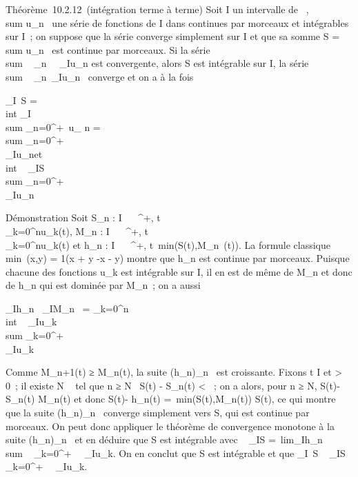 \documentclass[]{article}
\begin{document}
Théorème~10.2.12~(intégration terme à terme) Soit I un intervalle de ~,
\\sum  u\_n~ une
série de fonctions de I dans  continues par morceaux et intégrables sur
I~; on suppose que la série converge simplement sur I et que sa somme S
= \\sum  u\_n~
est continue par morceaux. Si la série
\\sum ~
\_n\in{}~\int ~
\_I\textbar{}u\_n\textbar{} est convergente, alors S est
intégrable sur I, la série
\\sum ~
\_n\in{}~\int  \_Iu\_n~ converge
et on a à la fois

\int  \_I~S =\\int
 \_I \\sum
\_n=0^+\infty~u\_ n = \\sum
\_n=0^+\infty~\\\int
  \_Iu\_n\text et
\\int  ~
\_I\textbar{}S\textbar{}\leq\\sum
\_n=0^+\infty~\\\int
  \_I\textbar{}u\_n\textbar{}

Démonstration Soit S\_n : I \rightarrow~ ~^+,
t\mapsto~\\\sum
 \_k=0^nu\_k(t), M\_n : I \rightarrow~
~^+,
t\mapsto~\\\sum
 \_k=0^n\textbar{}u\_k(t)\textbar{} et
h\_n : I \rightarrow~ ~^+,
t\mapsto~min(\textbar{}S(t)\textbar{},M\_n~(t)).
La formule classique min~(x,y) =
1(x + y -\textbar{}x - y\textbar{}) montre que
h\_n est continue par morceaux. Puisque chacune des fonctions
\textbar{}u\_k\textbar{} est intégrable sur I, il en est de même
de M\_n et donc de h\_n qui est dominée par
M\_n~; on a aussi

\int  \_Ih\_n~
\leq\int  \_IM\_n~ =
\sum \_k=0^n~
\\int  ~
\_I\textbar{}u\_k\textbar{}\leq\\sum
\_k=0^+\infty~\\\int
  \_I\textbar{}u\_k\textbar{}

Comme M\_n+1(t) ≥ M\_n(t), la suite
(h\_n)\_n\in{}~ est croissante. Fixons t \in I et \epsilon
\textgreater{} 0~; il existe N \in {}~ tel que n ≥ N \rigtharrow~\textbar{}S(t) -
S\_n(t)\textbar{} \textless{} \epsilon~; on a alors, pour n ≥ N,
\textbar{}S(t)\textbar{}- \epsilon \leq\textbar{}S\_n(t)\textbar{}\leq
M\_n(t) et donc \textbar{}S(t)\textbar{}- \epsilon \leq h\_n(t)
=\
min(\textbar{}S(t)\textbar{},M\_n(t))
\leq\textbar{}S(t)\textbar{}, ce qui montre que la suite
(h\_n)\_n\in{}~ converge simplement vers
\textbar{}S\textbar{}, qui est continue par morceaux. On peut donc
appliquer le théorème de convergence monotone à la suite
(h\_n)\_n\in{}~ et en déduire que \textbar{}S\textbar{} est
intégrable avec \int ~
\_I\textbar{}S\textbar{} =\
lim\int  \_Ih\_n~
\leq\\sum ~
\_k=0^+\infty~\int ~
\_I\textbar{}u\_k\textbar{}. On en conclut que S est
intégrable et que \left
\textbar{}\int  \_I~S\right
\textbar{}\leq\int ~
\_I\textbar{}S\textbar{}\leq\\\sum
 \_k=0^+\infty~\int ~
\_I\textbar{}u\_k\textbar{}.
\end{document}
